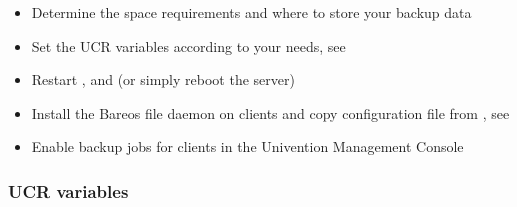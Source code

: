  \begin{itemize}
  \item Determine the space requirements and where to store your backup data
  \item Set the  UCR variables according to your needs, see 
  \item Restart ,  and  (or simply reboot the server)
  \item Install the Bareos file daemon on clients and copy configuration file from , see 
  \item Enable backup jobs for clients in the Univention Management Console
 \end{itemize}

\subsubsection{UCR variables}
\label{sec:UCR}

